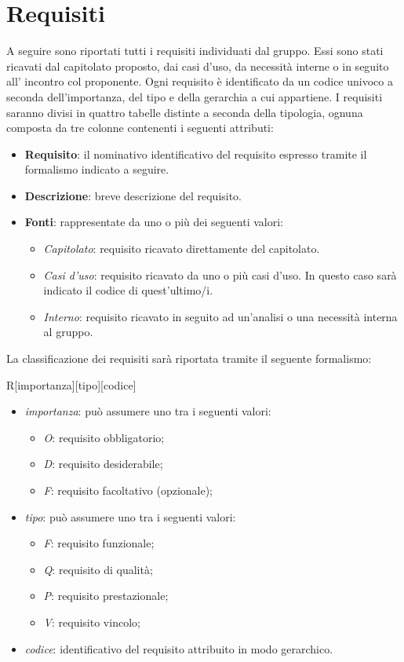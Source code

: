 
\section{Requisiti}

A seguire sono riportati tutti i requisiti individuati dal gruppo. Essi sono stati ricavati dal capitolato proposto, dai casi d'uso, da necessità interne o in seguito all' incontro col proponente. Ogni requisito è identificato da un codice univoco a seconda dell'importanza, del tipo e della gerarchia a cui appartiene.
I requisiti saranno divisi in quattro tabelle distinte a seconda della tipologia, ognuna composta da tre colonne contenenti i seguenti attributi:
\begin{itemize}
	\item \textbf{Requisito}: il nominativo identificativo del requisito espresso tramite il formalismo indicato a seguire.
	\item \textbf{Descrizione}: breve descrizione del requisito.
	\item \textbf{Fonti}: rappresentate da uno o più dei seguenti valori:
	\begin{itemize}
		\item \emph{Capitolato}: requisito ricavato direttamente del capitolato.
		\item \emph{Casi d'uso}: requisito ricavato da uno o più casi d'uso. In questo caso sarà indicato il codice di quest'ultimo/i.
		\item \emph{Interno}: requisito ricavato in seguito ad un'analisi o una necessità interna al gruppo.
	\end{itemize}
\end{itemize}

La classificazione dei requisiti sarà riportata tramite il seguente formalismo:
\begin{center}
	R[importanza][tipo][codice]
\end{center}
\begin{itemize}
	\item \emph{importanza}: può assumere uno tra i seguenti valori:
	\begin{itemize}
		\item \emph{O}: requisito obbligatorio;
		\item \emph{D}: requisito desiderabile;
		\item \emph{F}: requisito facoltativo (opzionale);
	\end{itemize}
	\item \emph{tipo}: può assumere uno tra i seguenti valori:
	\begin{itemize}
		\item \emph{F}: requisito funzionale;
		\item \emph{Q}: requisito di qualità;
		\item \emph{P}: requisito prestazionale;
		\item \emph{V}: requisito vincolo;
	\end{itemize}
	\item \emph{codice}: identificativo del requisito attribuito in modo gerarchico.
\end{itemize}


